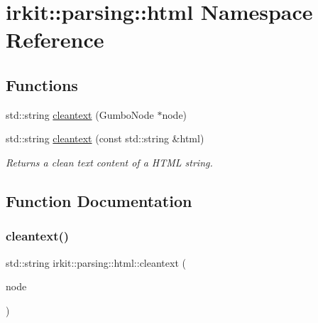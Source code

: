 \hypertarget{namespaceirkit_1_1parsing_1_1html}{}\section{irkit\+:\+:parsing\+:\+:html Namespace Reference}
\label{namespaceirkit_1_1parsing_1_1html}
\subsection*{Functions}
\begin{DoxyCompactItemize}
\item 
std\+::string \mbox{\hyperlink{namespaceirkit_1_1parsing_1_1html_a2723b493b49a10ad8e6707b8f9fb819d}{cleantext}} (Gumbo\+Node $\ast$node)
\item 
std\+::string \mbox{\hyperlink{namespaceirkit_1_1parsing_1_1html_a0083ba46d07a45979da7641d4c818b1e}{cleantext}} (const std\+::string \&html)
\begin{DoxyCompactList}\small\item\em Returns a clean text content of a H\+T\+ML string. \end{DoxyCompactList}\end{DoxyCompactItemize}


\subsection{Function Documentation}
\mbox{\label{namespaceirkit_1_1parsing_1_1html_a2723b493b49a10ad8e6707b8f9fb819d}} 
\subsubsection{\texorpdfstring{cleantext()}{cleantext()}\hspace{0.1cm}{\footnotesize\ttfamily [1/2]}}
{\footnotesize\ttfamily std\+::string irkit\+::parsing\+::html\+::cleantext (\begin{DoxyParamCaption}\item[{Gumbo\+Node $\ast$}]{node }\end{DoxyParamCaption})}

\mbox{\label{namespaceirkit_1_1parsing_1_1html_a0083ba46d07a45979da7641d4c818b1e}} 
